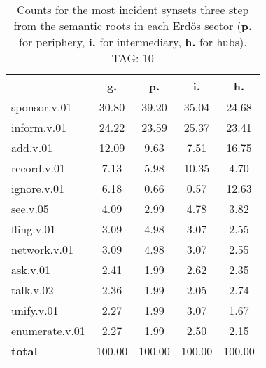 \begin{table}[h!]
\begin{center}
\begin{tabular}{| l || c | c | c | c |}\hline
 & {\bf g.} & {\bf p.} & {\bf i.} & {\bf h.} \\\hline\hline
sponsor.v.01 & 30.80  & 39.20  & 35.04  & 24.68 \\\hline
inform.v.01 & 24.22  & 23.59  & 25.37  & 23.41 \\\hline
add.v.01 & 12.09  & 9.63  & 7.51  & 16.75 \\\hline
record.v.01 & 7.13  & 5.98  & 10.35  & 4.70 \\\hline
ignore.v.01 & 6.18  & 0.66  & 0.57  & 12.63 \\\hline
see.v.05 & 4.09  & 2.99  & 4.78  & 3.82 \\\hline
fling.v.01 & 3.09  & 4.98  & 3.07  & 2.55 \\\hline
network.v.01 & 3.09  & 4.98  & 3.07  & 2.55 \\\hline
ask.v.01 & 2.41  & 1.99  & 2.62  & 2.35 \\\hline
talk.v.02 & 2.36  & 1.99  & 2.05  & 2.74 \\\hline
unify.v.01 & 2.27  & 1.99  & 3.07  & 1.67 \\\hline
enumerate.v.01 & 2.27  & 1.99  & 2.50  & 2.15 \\\hline\hline
{{\bf total}} & 100.00  & 100.00  & 100.00  & 100.00 \\\hline
\end{tabular}
\caption{Counts for the most incident synsets three step from the semantic roots in each Erd\"os sector ({\bf p.} for periphery, {\bf i.} for intermediary, {\bf h.} for hubs). TAG: 10}
\end{center}
\end{table}
